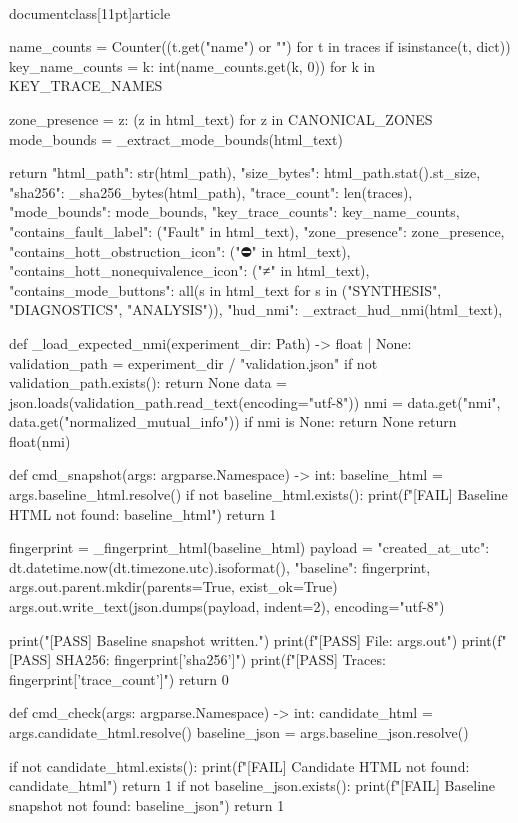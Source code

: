 \\documentclass[11pt]{article}
\begin{document}
\begin{CodeBlock}
    name_counts = Counter((t.get("name") or "") for t in traces if isinstance(t, dict))
    key_name_counts = {k: int(name_counts.get(k, 0)) for k in KEY_TRACE_NAMES}

    zone_presence = {z: (z in html_text) for z in CANONICAL_ZONES}
    mode_bounds = _extract_mode_bounds(html_text)

    return {
        "html_path": str(html_path),
        "size_bytes": html_path.stat().st_size,
        "sha256": _sha256_bytes(html_path),
        "trace_count": len(traces),
        "mode_bounds": mode_bounds,
        "key_trace_counts": key_name_counts,
        "contains_fault_label": ("Fault" in html_text),
        "zone_presence": zone_presence,
        "contains_hott_obstruction_icon": ("⛔" in html_text),
        "contains_hott_nonequivalence_icon": ("≠" in html_text),
        "contains_mode_buttons": all(s in html_text for s in ("SYNTHESIS", "DIAGNOSTICS", "ANALYSIS")),
        "hud_nmi": _extract_hud_nmi(html_text),
    }


def _load_expected_nmi(experiment_dir: Path) -> float | None:
    validation_path = experiment_dir / "validation.json"
    if not validation_path.exists():
        return None
    data = json.loads(validation_path.read_text(encoding="utf-8"))
    nmi = data.get("nmi", data.get("normalized_mutual_info"))
    if nmi is None:
        return None
    return float(nmi)


def cmd_snapshot(args: argparse.Namespace) -> int:
    baseline_html = args.baseline_html.resolve()
    if not baseline_html.exists():
        print(f"[FAIL] Baseline HTML not found: {baseline_html}")
        return 1

    fingerprint = _fingerprint_html(baseline_html)
    payload = {
        "created_at_utc": dt.datetime.now(dt.timezone.utc).isoformat(),
        "baseline": fingerprint,
    }
    args.out.parent.mkdir(parents=True, exist_ok=True)
    args.out.write_text(json.dumps(payload, indent=2), encoding="utf-8")

    print("[PASS] Baseline snapshot written.")
    print(f"[PASS] File: {args.out}")
    print(f"[PASS] SHA256: {fingerprint['sha256']}")
    print(f"[PASS] Traces: {fingerprint['trace_count']}")
    return 0


def cmd_check(args: argparse.Namespace) -> int:
    candidate_html = args.candidate_html.resolve()
    baseline_json = args.baseline_json.resolve()

    if not candidate_html.exists():
        print(f"[FAIL] Candidate HTML not found: {candidate_html}")
        return 1
    if not baseline_json.exists():
        print(f"[FAIL] Baseline snapshot not found: {baseline_json}")
        return 1


\end{CodeBlock}
\end{document}
